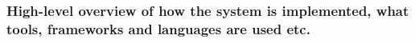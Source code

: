 \subsubsection{High-level overview of how the system is implemented, what tools, frameworks
			   and languages are used etc.}
